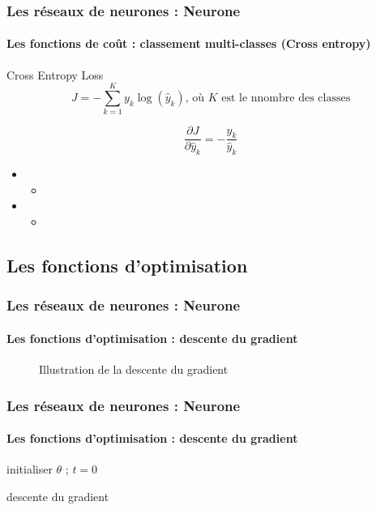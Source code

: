\documentclass[xcolor=table]{beamer}
\begin{document}
\begin{frame}
\frametitle{Les réseaux de neurones : Neurone}
\framesubtitle{Les fonctions de coût : classement multi-classes (Cross entropy)}

\begin{block}{Cross Entropy Loss}
	\[J = - \sum\limits_{k=1}^{K} y_{k} \log(\hat{y}_{k}) \text{, où } K \text{ est le nnombre des classes} \]
	
	\[
	\frac{\partial J}{\partial \hat{y}_k} = - \frac{y_{k}}{\hat{y}_{k}}
	\]
\end{block}

\begin{itemize}
	\item {}
	\begin{itemize}
		\item 
	\end{itemize}
	\item {}
	\begin{itemize}
		\item 
	\end{itemize}
\end{itemize}

\end{frame}

\subsection{Les fonctions d'optimisation}

\begin{frame}
\frametitle{Les réseaux de neurones : Neurone}
\framesubtitle{Les fonctions d'optimisation : descente du gradient}

\begin{figure}
	\caption{Illustration de la descente du gradient \cite{2020-calin}}
\end{figure}

\end{frame}

\begin{frame}
\frametitle{Les réseaux de neurones : Neurone}
\framesubtitle{Les fonctions d'optimisation : descente du gradient}

\begin{algorithm}[H]
	\KwResult{$ \theta $}
	initialiser $ \theta $ ; $ t = 0 $\;
	\caption{descente du gradient}
\end{algorithm}

\end{frame}
\end{document}
